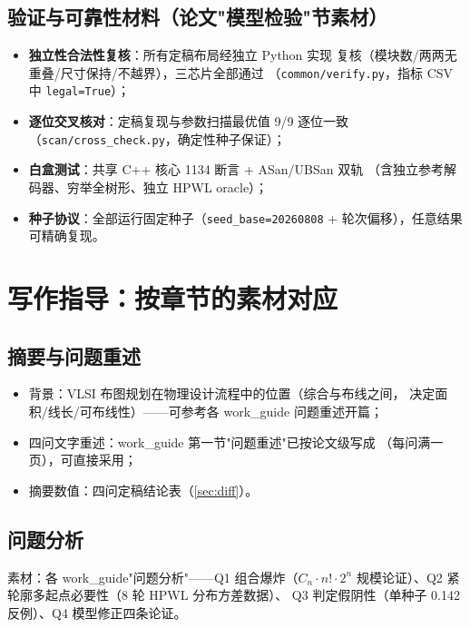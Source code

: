 \documentclass[12pt,a4paper]{article}
\begin{document}
\subsection{验证与可靠性材料（论文"模型检验"节素材）}

\begin{itemize}
    \item \textbf{独立性合法性复核}：所有定稿布局经独立 Python 实现
    复核（模块数/两两无重叠/尺寸保持/不越界），三芯片全部通过
    （\texttt{common/verify.py}，指标 CSV 中 \texttt{legal=True}）；
    \item \textbf{逐位交叉核对}：定稿复现与参数扫描最优值 9/9 逐位一致
    （\texttt{scan/cross\_check.py}，确定性种子保证）；
    \item \textbf{白盒测试}：共享 C++ 核心 1134 断言 + ASan/UBSan 双轨
    （含独立参考解码器、穷举全树形、独立 HPWL oracle）；
    \item \textbf{种子协议}：全部运行固定种子（\texttt{seed\_base=20260808}
    + 轮次偏移），任意结果可精确复现。
\end{itemize}

\section{写作指导：按章节的素材对应}

\subsection{摘要与问题重述}

\begin{itemize}
    \item 背景：VLSI 布图规划在物理设计流程中的位置（综合与布线之间，
    决定面积/线长/可布线性）——可参考各 work\_guide 问题重述开篇；
    \item 四问文字重述：work\_guide 第一节"问题重述"已按论文级写成
    （每问满一页），可直接采用；
    \item 摘要数值：四问定稿结论表（\ref{sec:diff}）。
\end{itemize}

\subsection{问题分析}

素材：各 work\_guide"问题分析"——Q1 组合爆炸（$C_n\cdot n!\cdot2^n$
规模论证）、Q2 紧轮廓多起点必要性（8 轮 HPWL 分布方差数据）、
Q3 判定假阴性（单种子 0.142 反例）、Q4 模型修正四条论证。
\end{document}
